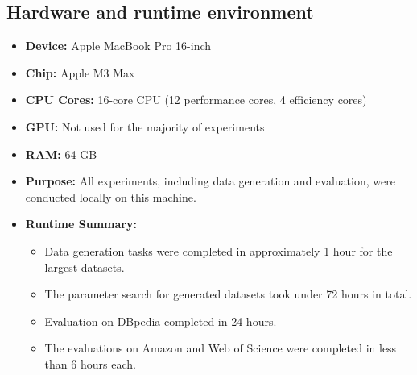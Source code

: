 \subsection{Hardware and runtime environment}
\begin{itemize}
  \item \textbf{Device:} Apple MacBook Pro 16-inch
  \item \textbf{Chip:} Apple M3 Max
  \item \textbf{CPU Cores:} 16-core CPU (12 performance cores, 4 efficiency cores)
  \item \textbf{GPU:} Not used for the majority of experiments
  \item \textbf{RAM:} 64 GB
  \item \textbf{Purpose:} All experiments, including data generation and evaluation, were conducted locally on this machine.
  \item \textbf{Runtime Summary:}
  \begin{itemize}
    \item Data generation tasks were completed in approximately 1 hour for the largest datasets.
    \item The parameter search for generated datasets took under 72 hours in total.
    \item Evaluation on DBpedia completed in 24 hours.
    \item The evaluations on Amazon and Web of Science were completed in less than 6 hours each.
  \end{itemize}
  
\end{itemize}


% 